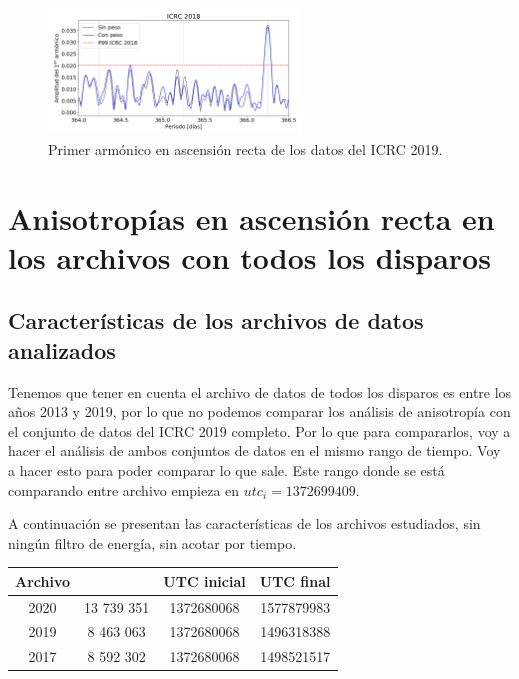 			\begin{figure}[H]
				\centering
				\includegraphics[width=0.6\textwidth]{ICRC/ICRC2019_Eraw_Eraw_hex.png}
				\caption{Primer armónico en ascensión recta de los datos del ICRC 2019.} \label{fig:8EeV_con_peso_ICRC2019}
			\end{figure}


			
	\section{Anisotropías en ascensión recta en los archivos con todos los disparos}
		\subsection{Características de los archivos de datos analizados}

			Tenemos que tener en cuenta el archivo de datos de todos los disparos es entre los años 2013 y 2019, por lo que no podemos comparar los análisis de anisotropía con el conjunto  de datos del ICRC 2019 completo. Por lo que para compararlos, voy a hacer el análisis de ambos conjuntos de datos en el mismo rango de tiempo. Voy a hacer esto para poder comparar lo que sale. 			Este rango donde se está comparando entre archivo empieza en  $utc_i = 1372699409 $.


			A continuación se presentan las características de los archivos estudiados, sin ningún filtro de energía, sin acotar por tiempo. 

			\begin{table}[H]
			\centering
				\begin{tabular}{c|c|c|c}
				\textbf{Archivo} & \text{Eventos} & UTC inicial &  UTC final  \\ \hline
				2020			 & 13 739 351	  &  1372680068	&  1577879983 \\
				2019			 & 	8 463 063	  &	 1372680068 &  1496318388 \\
				2017			 &	8 592 302	  &  1372680068 &  1498521517 \\
					\end{tabular}
			\end{table}
			
